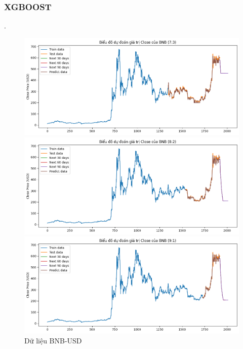 \documentclass[conference]{IEEEtran}
\begin{document}
	\subsubsection{XGBOOST}.
    \begin{figure}[H]
			\centering
			\begin{minipage}{0.15\textwidth}
				\centering
				\includegraphics[width=1\textwidth]{Figure/XGB_BNB_73.png}
			\end{minipage}
			\hfill
			\begin{minipage}{0.15\textwidth}
				\centering
				\includegraphics[width=1\textwidth]{Figure/XGB_BNB_82.png}
			\end{minipage}
			\hfill
			\begin{minipage}{0.15\textwidth}
				\centering
			\includegraphics[width=1\textwidth]{Figure/XGB_BNB_91.png}
			\end{minipage}
			\caption{Dữ liệu BNB-USD}
			\label{fig:1}
		\end{figure}
\end{document}
